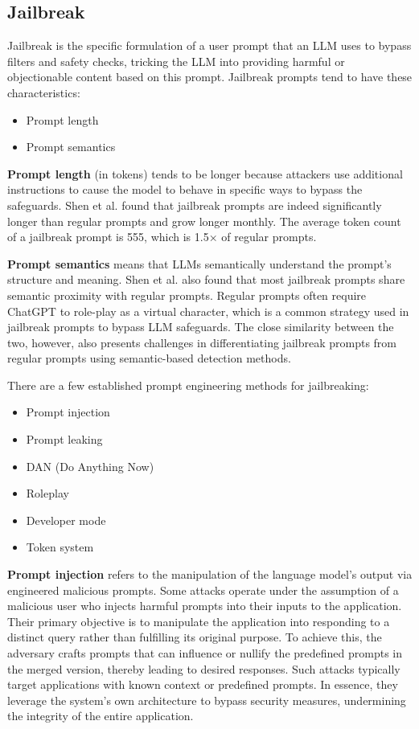 \subsection{Jailbreak \label{sec:jailbreak}}
Jailbreak is the specific formulation of a user prompt that an LLM uses to bypass filters and safety checks, tricking the LLM into providing harmful or objectionable content based on this prompt.
Jailbreak prompts tend to have these characteristics:
\begin{itemize}
    \item Prompt length
    \item Prompt semantics
\end{itemize}

\textbf{Prompt length} (in tokens) tends to be longer because attackers use additional instructions to cause the model to behave in specific ways to bypass the safeguards.
Shen et al.\cite{shen2024donowcharacterizingevaluating} found that jailbreak prompts are indeed significantly longer than regular prompts and grow longer monthly. The average token count of a jailbreak prompt is 555, which is 1.5× of regular prompts.

\textbf{Prompt semantics} means that LLMs semantically understand the prompt's structure and meaning. Shen et al.\cite{shen2024donowcharacterizingevaluating} also found that most jailbreak prompts share semantic proximity with regular prompts. Regular prompts often require ChatGPT to role-play as a virtual character, which is a common strategy used in jailbreak prompts to bypass LLM safeguards. The close similarity between the two, however, also presents challenges in differentiating jailbreak prompts from regular prompts using semantic-based detection methods.



There are a few established prompt engineering methods for jailbreaking:
\begin{itemize}
    \item Prompt injection
    \item Prompt leaking
    \item DAN (Do Anything Now)
    \item Roleplay
    \item Developer mode
    \item Token system
\end{itemize}

\textbf{Prompt injection} refers to the manipulation of the language model's output via engineered malicious prompts. Some attacks operate under the assumption of a malicious user who injects harmful prompts into their inputs to the application. Their primary objective is to manipulate the application into responding to a distinct query rather than fulfilling its original purpose. To achieve this, the adversary crafts prompts that can influence or nullify the predefined prompts in the merged version, thereby leading to desired responses. Such attacks typically target applications with known context or predefined prompts. In essence, they leverage the system's own architecture to bypass security measures, undermining the integrity of the entire application\cite{liu2024promptinjectionattackllmintegrated}.

